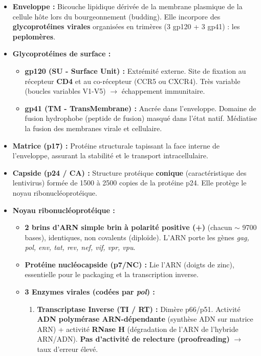 \documentclass[11pt]{article}
\begin{document}
\begin{aretenir}
\begin{itemize}
    \item \textbf{Enveloppe :} Bicouche lipidique dérivée de la membrane plasmique de la cellule hôte lors du bourgeonnement (budding). Elle incorpore des \textbf{glycoprotéines virales} organisées en trimères (3 gp120 + 3 gp41) : les \textbf{peplomères}.
    \item \textbf{Glycoprotéines de surface :}
    \begin{itemize}
        \item \textbf{gp120 (SU - Surface Unit) :} Extrémité externe. Site de fixation au récepteur \textbf{CD4} et au co-récepteur (CCR5 ou CXCR4). Très variable (boucles variables V1-V5) $\rightarrow$ échappement immunitaire.
        \item \textbf{gp41 (TM - TransMembrane) :} Ancrée dans l'enveloppe. Domaine de fusion hydrophobe (peptide de fusion) masqué dans l'état natif. Médiatise la fusion des membranes virale et cellulaire.
    \end{itemize}
    \item \textbf{Matrice (p17) :} Protéine structurale tapissant la face interne de l'enveloppe, assurant la stabilité et le transport intracellulaire.
    \item \textbf{Capside (p24 / CA) :} Structure protéique \textbf{conique} (caractéristique des lentivirus) formée de \num{1500} à \num{2500} copies de la protéine p24. Elle protège le noyau ribonucléoprotéique.
    \item \textbf{Noyau ribonucléoprotéique :}
    \begin{itemize}
        \item \textbf{2 brins d'ARN simple brin à polarité positive (+)} (chacun $\sim$ \num{9700} bases), identiques, non covalents (diploïde). L'ARN porte les gènes \emph{gag, pol, env, tat, rev, nef, vif, vpr, vpu}.
        \item \textbf{Protéine nucléocapside (p7/NC) :} Lie l'ARN (doigts de zinc), essentielle pour le packaging et la transcription inverse.
        \item \textbf{3 Enzymes virales (codées par \emph{pol}) :}
        \begin{enumerate}
            \item \textbf{Transcriptase Inverse (TI / RT) :} Dimère p66/p51. Activité \textbf{ADN polymérase ARN-dépendante} (synthèse ADN sur matrice ARN) + activité \textbf{RNase H} (dégradation de l'ARN de l'hybride ARN/ADN). \textbf{Pas d'activité de relecture (proofreading)} $\rightarrow$ taux d'erreur élevé.

\end{enumerate}
\end{itemize}
\end{itemize}
\end{aretenir}
\end{document}
